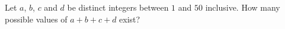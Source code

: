 Let $a$, $b$, $c$ and $d$ be distinct integers between $1$ and $50$ inclusive. How many possible values of $a+b+c+d$ exist?
